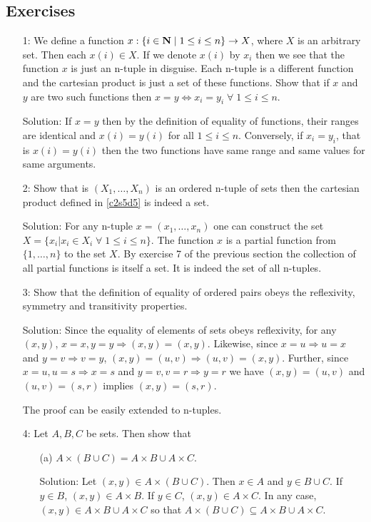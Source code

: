 \subsection{Exercises}
\begin{enumerate}
\item[1:] We define a function $x: \{i \in \mathbf{N}\;|\; 1 \le i \le n\}
\rightarrow X$, where $X$ is an arbitrary set. Then each $x(i) \in X$. If
we denote $x(i)$ by $x_i$ then we see that the function $x$ is just an
n-tuple in disguise. Each n-tuple is a different function and the 
cartesian product is just a set of these functions. Show that if $x$ and 
$y$ are two such functions then $x = y \Leftrightarrow x_i = y_i \;\forall
\; 1 \le i \le n$.
\item[Solution:] If $x = y$ then by the definition of equality of 
functions, their ranges are identical and $x(i) = y(i)$ for all $1 \le i
\le n$. Conversely, if $x_i = y_i$, that is $x(i) = y(i)$ then the two
functions have same range and same values for same arguments.

\item[2:] Show that is $(X_1, \ldots, X_n)$ is an ordered n-tuple of sets
then the cartesian product defined in \ref{c2s5d5} is indeed a set.
\item[Solution:] For any n-tuple $x = (x_1, \ldots, x_n)$ one can construct
the set $X = \{x_i | x_i \in X_i \;\forall\; 1 \le i \le n\}$. The function
$x$ is a partial function from $\{1, \ldots, n\}$ to the set $X$. By 
exercise 7 of the previous section the collection of all partial functions
is itself a set. It is indeed the set of all n-tuples.

\item[3:] Show that the definition of equality of ordered pairs obeys
the reflexivity, symmetry and transitivity properties.
\item[Solution:] Since the equality of elements of sets obeys reflexivity,
for any $(x, y)$, $x = x, y = y \Rightarrow (x, y) = (x, y)$. Likewise,
since $x = u \Rightarrow u = x$ and $y = v \Rightarrow v = y$, $(x, y)
= (u, v) \Rightarrow (u, v) = (x, y)$. Further, since $x = u, u = s 
\Rightarrow x = s$ and $y = v, v = r \Rightarrow y = r$ we have $(x, y)
= (u, v)$ and $(u, v) = (s, r)$ implies $(x, y) = (s, r)$.

The proof can be easily extended to n-tuples.

\item[4:] Let $A, B, C$ be sets. Then show that
\begin{enumerate}
\item[(a)] $A \times (B \cup C) = A \times B \cup A \times C$. 
\item[Solution:] Let $(x, y)
\in A \times (B \cup C)$. Then $x \in A$ and $y \in B \cup C$. If $y \in
B$, $(x, y) \in A \times B$. If $y \in C$, $(x, y) \in A \times C$. In
any case, $(x, y) \in A \times B \cup A \times C$ so that $A \times (B
\cup C) \subseteq A \times B \cup A \times C$.


\end{enumerate}
\end{enumerate}
